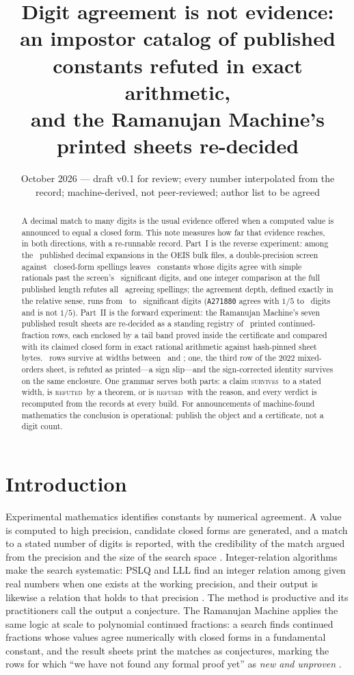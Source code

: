 \documentclass[11pt]{article}
\title{Digit agreement is not evidence:\\
an impostor catalog of published constants refuted in exact arithmetic,\\
and the Ramanujan Machine's printed sheets re-decided}
\author{\cmauthor}
\date{October 2026 --- draft v0.1 for review; every number interpolated from the record; machine-derived, not peer-reviewed; author list to be agreed}
\theoremstyle{definition}
\theoremstyle{plain}
\newcommand{\vS}{\textsc{survives}}
\newcommand{\vR}{\textsc{refuted}}
\newcommand{\vF}{\textsc{refused}}
\begin{document}
\maketitle

\begin{abstract}
A decimal match to many digits is the usual evidence offered when a computed value is announced to equal a closed form. This note measures how far that evidence reaches, in both directions, with a re-runnable record. Part~I is the reverse experiment: among the \OeisAudited\ published decimal expansions in the OEIS bulk files, a double-precision screen against \FormsTested\ closed-form spellings leaves \ImpConstants\ constants whose digits agree with simple rationals past the screen's \ScreenDigits\ significant digits, and one integer comparison at the full published length refutes all \ImpCount\ agreeing spellings; the agreement depth, defined exactly in the relative sense, runs from \ImpShallowest\ to \ImpDeepest\ significant digits (\texttt{A271880} agrees with $1/5$ to \EvilDepth\ digits and is not $1/5$). Part~II is the forward experiment: the Ramanujan Machine's seven published result sheets are re-decided as a standing registry of \RmPrinted\ printed continued-fraction rows, each enclosed by a tail band proved inside the certificate and compared with its claimed closed form in exact rational arithmetic against hash-pinned sheet bytes. \RmSurvive\ rows survive at widths between \RmNarrowest\ and \RmWidest; one, the third row of the 2022 mixed-orders sheet, is refuted as printed---a sign slip---and the sign-corrected identity survives on the same enclosure. One grammar serves both parts: a claim \vS\ to a stated width, is \vR\ by a theorem, or is \vF\ with the reason, and every verdict is recomputed from the records at every build. For announcements of machine-found mathematics the conclusion is operational: publish the object and a certificate, not a digit count.
\end{abstract}

\section{Introduction}

Experimental mathematics identifies constants by numerical agreement. A value is computed to high precision, candidate closed forms are generated, and a match to a stated number of digits is reported, with the credibility of the match argued from the precision and the size of the search space \cite{BB04}. Integer-relation algorithms make the search systematic: PSLQ and LLL find an integer relation among given real numbers when one exists at the working precision, and their output is likewise a relation that holds to that precision \cite{FBA99,LLL82}. The method is productive and its practitioners call the output a conjecture. The Ramanujan Machine \cite{RM21} applies the same logic at scale to polynomial continued fractions: a search finds continued fractions whose values agree numerically with closed forms in a fundamental constant, and the result sheets print the matches as conjectures, marking the rows for which ``we have not found any formal proof yet'' as \emph{new and unproven} \cite{RMsheets}.
\end{document}

